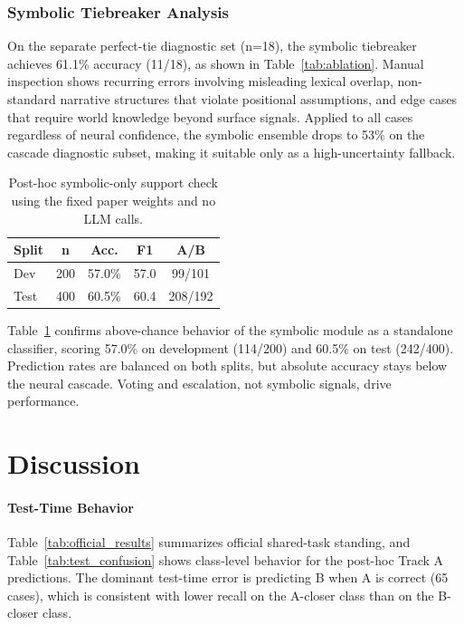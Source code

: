 \documentclass[11pt]{article}
\begin{document}
\subsubsection{Symbolic Tiebreaker Analysis}

On the separate perfect-tie diagnostic set (n=18), the symbolic tiebreaker achieves 61.1\% accuracy (11/18), as shown in Table~\ref{tab:ablation}. Manual inspection shows recurring errors involving misleading lexical overlap, non-standard narrative structures that violate positional assumptions, and edge cases that require world knowledge beyond surface signals. Applied to all cases regardless of neural confidence, the symbolic ensemble drops to 53\% on the cascade diagnostic subset, making it suitable only as a high-uncertainty fallback.

\begin{table}[t]
\centering
\footnotesize
\begin{tabular}{@{}lcccc@{}}
\toprule
\textbf{Split} & \textbf{n} & \textbf{Acc.} & \textbf{F1} & \textbf{A/B} \\
\midrule
Dev & 200 & 57.0\% & 57.0 & 99/101 \\
Test & 400 & 60.5\% & 60.4 & 208/192 \\
\bottomrule
\end{tabular}
\caption{Post-hoc symbolic-only support check using the fixed paper weights and no LLM calls.}
\label{tab:symbolic_only}
\end{table}

Table~\ref{tab:symbolic_only} confirms above-chance behavior of the symbolic module as a standalone classifier, scoring 57.0\% on development (114/200) and 60.5\% on test (242/400). Prediction rates are balanced on both splits, but absolute accuracy stays below the neural cascade. Voting and escalation, not symbolic signals, drive performance.


\section{Discussion}

\paragraph{Test-Time Behavior}
Table~\ref{tab:official_results} summarizes official shared-task standing, and Table~\ref{tab:test_confusion} shows class-level behavior for the post-hoc Track A predictions. The dominant test-time error is predicting B when A is correct (65 cases), which is consistent with lower recall on the A-closer class than on the B-closer class.
\end{document}
